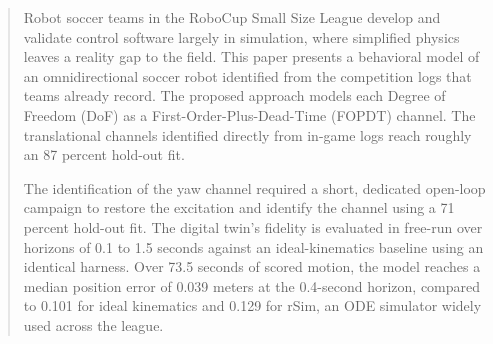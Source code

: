\begin{abstract}
Robot soccer teams in the RoboCup Small Size League develop and validate control software largely in simulation, where simplified physics leaves a reality gap to the field. This paper presents a behavioral model of an omnidirectional soccer robot identified from the competition logs that teams already record. The proposed approach models each Degree of Freedom (DoF) as a First-Order-Plus-Dead-Time (FOPDT) channel. The translational channels identified directly from in-game logs reach roughly an 87 percent hold-out fit. 

The identification of the yaw channel required a short, dedicated open-loop campaign to restore the excitation and identify the channel using a 71 percent hold-out fit. The digital twin's fidelity is evaluated in free-run over horizons of 0.1 to 1.5 seconds against an ideal-kinematics baseline using an identical harness.  Over 73.5 seconds of scored motion, the model reaches a median position error of 0.039 meters at the 0.4-second horizon, compared to 0.101 for ideal kinematics and 0.129 for rSim, an ODE simulator widely used across the league.
\end{abstract}
